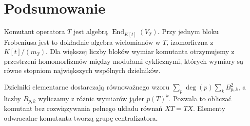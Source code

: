\section{Podsumowanie}
\label{sec:lin21-summary}

Komutant operatora \(T\) jest
algebrą \(\operatorname{End}_{K[t]}(V_T)\).
Przy jednym bloku Frobeniusa
jest to dokładnie algebra
wielomianów w \(T\),
izomorficzna z \(K[t]/(m_T)\).
Dla większej liczby bloków
wymiar komutanta otrzymujemy
z przestrzeni homomorfizmów
między modułami cyklicznymi,
których wymiary są równe stopniom
największych wspólnych dzielników.

Dzielniki elementarne dostarczają
równoważnego wzoru
\(\sum_p\deg(p)\sum_k B_{p,k}^2\),
a liczby \(B_{p,k}\) wyliczamy
z różnic wymiarów jąder \(p(T)^k\).
Pozwala to obliczać komutant
bez rozwiązywania pełnego układu
równań \(XT=TX\).
Elementy odwracalne komutanta
tworzą grupę centralizatora.
